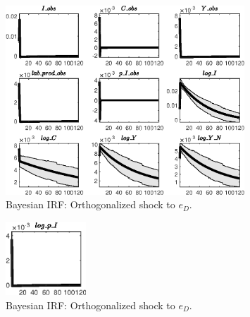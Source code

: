 \begin{figure}[H]
\centering 
\includegraphics[width=0.80\textwidth]{BRS_growth_ext_fd_v1/Output/BRS_growth_ext_fd_v1_Bayesian_IRF_e_D_1}
\caption{Bayesian IRF: Orthogonalized shock to ${e_D}$.}
\label{Fig:BayesianIRF:e_D:1}
\end{figure}
 
\begin{figure}[H]
\centering 
\includegraphics[width=0.27\textwidth]{BRS_growth_ext_fd_v1/Output/BRS_growth_ext_fd_v1_Bayesian_IRF_e_D_2}
\caption{Bayesian IRF: Orthogonalized shock to ${e_D}$.}
\label{Fig:BayesianIRF:e_D:2}
\end{figure}
 
